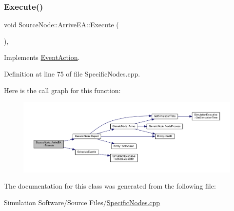 \subsubsection{\texorpdfstring{Execute()}{Execute()}}
{\footnotesize\ttfamily void Source\+Node\+::\+Arrive\+E\+A\+::\+Execute (\begin{DoxyParamCaption}{ }\end{DoxyParamCaption})\hspace{0.3cm}{\ttfamily [inline]}, {\ttfamily [virtual]}}



Implements \hyperlink{class_event_action_a62b9d07abb4ca8e7c078b076a1ab1a9f}{Event\+Action}.



Definition at line 75 of file Specific\+Nodes.\+cpp.

Here is the call graph for this function\+:\nopagebreak
\begin{figure}[H]
\begin{center}
\leavevmode
\includegraphics[width=350pt]{class_source_node_1_1_arrive_e_a_a622b2282aae023818b26d39519143c15_cgraph}
\end{center}
\end{figure}


The documentation for this class was generated from the following file\+:\begin{DoxyCompactItemize}
\item 
Simulation Software/\+Source Files/\hyperlink{_specific_nodes_8cpp}{Specific\+Nodes.\+cpp}\end{DoxyCompactItemize}
